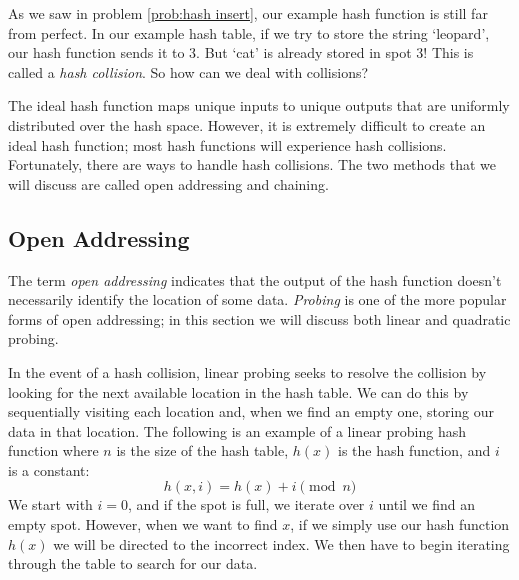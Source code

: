 As we saw in problem \ref{prob:hash insert}, our example hash function is still far from perfect.
In our example hash table, if we try to store the string `leopard', our hash function sends it to 3.
But `cat' is already stored in spot 3!
This is called a \emph{hash collision}.
So how can we deal with collisions?
\begin{center}
\end{center}

The ideal hash function maps unique inputs to unique outputs that are uniformly distributed over the hash space.
However, it is extremely difficult to create an ideal hash function; most hash functions will experience hash collisions.
Fortunately, there are ways to handle hash collisions.
The two methods that we will discuss are called open addressing and chaining.

\subsection*{Open Addressing}
The term \emph{open addressing} indicates that the output of the hash function doesn't necessarily identify the location of some data.
\emph{Probing} is one of the more popular forms of open addressing; in this section we will discuss both linear and quadratic probing.

In the event of a hash collision, linear probing seeks to resolve the collision by looking for the next available location in the hash table.
We can do this by sequentially visiting each location and, when we find an empty one, storing our data in that location.
The following is an example of a linear probing hash function where $n$ is the size of the hash table, $h(x)$ is the hash function, and $i$ is a constant:
\begin{equation*}
h(x, i) = h(x) + i \pmod{n}
\end{equation*}
We start with $i = 0$, and if the spot is full, we iterate over $i$ until we find an empty spot.
However, when we want to find $x$, if we simply use our hash function $h(x)$ we will be directed to the incorrect index.
We then have to begin iterating through the table to search for our data.

